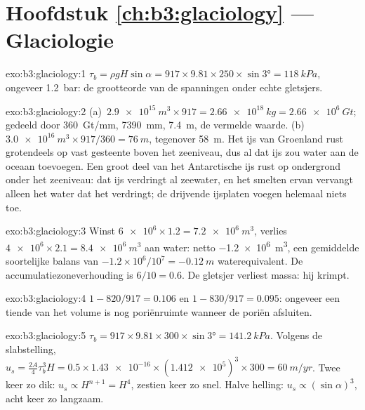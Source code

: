\section*{Hoofdstuk \ref{ch:b3:glaciology} --- Glaciologie}

\begin{solution}{exo:b3:glaciology:1}
$\tau_b = \rho gH\sin\alpha = 917\times9.81\times250\times\sin\ang{3} =
\qty{118}{kPa}$, ongeveer \qty{1.2}{bar}: de grootteorde van de spanningen onder echte
gletsjers.
\end{solution}

\begin{solution}{exo:b3:glaciology:2}
(a)~$\qty{2.9e15}{m^3}\times917 = \qty{2.66e18}{kg} = \qty{2.66e6}{Gt}$;
gedeeld door \qty{360}{Gt/mm}, \qty{7390}{mm}, \qty{7.4}{m}, de vermelde waarde.
(b)~$\qty{3.0e16}{m^3}\times917/360 = \qty{76}{m}$, tegenover \qty{58}{m}.
Het ijs van Groenland rust grotendeels op vast gesteente boven het zeeniveau, dus al dat ijs zou
water aan de oceaan toevoegen. Een groot deel van het Antarctische ijs rust op ondergrond onder
het zeeniveau: dat ijs verdringt al zeewater, en het smelten ervan vervangt alleen
het water dat het verdringt; de drijvende ijsplaten voegen helemaal niets toe.
\end{solution}

\begin{solution}{exo:b3:glaciology:3}
Winst $\num{6e6}\times1.2 = \qty{7.2e6}{m^3}$, verlies $\num{4e6}\times2.1 =
\qty{8.4e6}{m^3}$ aan water: netto \qty{-1.2e6}{m^3}, een gemiddelde soortelijke balans
van $-1.2\times10^6/10^7 = \qty{-0.12}{m}$ waterequivalent. De
accumulatiezoneverhouding is $6/10 = 0.6$. De gletsjer verliest massa:
hij krimpt.
\end{solution}

\begin{solution}{exo:b3:glaciology:4}
$1 - 820/917 = \num{0.106}$ en $1 - 830/917 = \num{0.095}$: ongeveer een tiende
van het volume is nog poriënruimte wanneer de poriën afsluiten.
\end{solution}

\begin{solution}{exo:b3:glaciology:5}
$\tau_b = 917\times9.81\times300\times\sin\ang{3} = \qty{141.2}{kPa}$. Volgens
de slabstelling, $u_s = \tfrac{2A}{4}\tau_b^3H = 0.5\times\num{1.43e-16}
\times(\num{1.412e5})^3\times300 = \qty{60}{m/yr}$. Twee keer zo dik: $u_s
\propto H^{n+1} = H^4$, zestien keer zo snel. Halve helling: $u_s \propto
(\sin\alpha)^3$, acht keer zo langzaam.
\end{solution}

